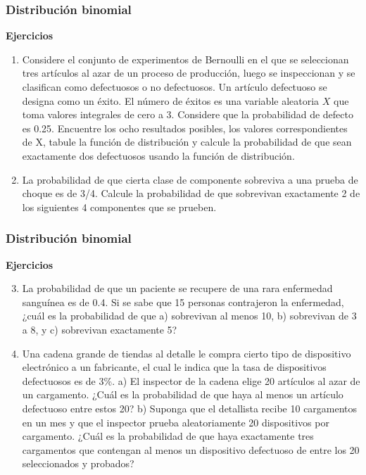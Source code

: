 \documentclass[spanish]{beamer}
\begin{document}
\begin{frame}
\frametitle{Distribución binomial}
\textbf{Ejercicios}

  \begin{enumerate}
  
  
\item Considere el conjunto de experimentos de Bernoulli en el que se seleccionan tres artículos al azar de un proceso de producción, luego se inspeccionan y se clasifican como defectuosos o no defectuosos. Un artículo defectuoso se designa como un éxito. El número de éxitos es una variable aleatoria $X$ que toma valores integrales de cero a 3. Considere que la probabilidad de defecto es 0.25. Encuentre los ocho resultados posibles, los valores correspondientes de X, tabule la función de distribución y calcule la probabilidad de que sean exactamente dos defectuosos usando la función de distribución.  
    
\item La probabilidad de que cierta clase de componente sobreviva a una prueba de choque es de 3/4. Calcule la probabilidad de que sobrevivan exactamente 2 de los siguientes 4 componentes que se prueben.

    
\end{enumerate}      
    
\end{frame}
\begin{frame}
\frametitle{Distribución binomial}
\textbf{Ejercicios}

  \begin{enumerate}
  \setcounter{enumi}{2}
\item La probabilidad de que un paciente se recupere de una rara enfermedad sanguínea es de 0.4. Si se sabe que 15 personas contrajeron la enfermedad, ¿cuál es la probabilidad de que a) sobrevivan al menos 10, b) sobrevivan de 3 a 8, y c) sobrevivan exactamente 5?
  
    
\item Una cadena grande de tiendas al detalle le compra cierto tipo de dispositivo electrónico a un fabricante, el cual le indica que la tasa de dispositivos defectuosos es de 3\%. 
    a) El inspector de la cadena elige 20 artículos al azar de un cargamento. ¿Cuál es la probabilidad de que haya al menos un artículo defectuoso entre estos 20?
    b) Suponga que el detallista recibe 10 cargamentos en un mes y que el inspector prueba aleatoriamente 20 dispositivos por cargamento. ¿Cuál es la probabilidad de que haya exactamente tres cargamentos que contengan al menos un dispositivo defectuoso de entre los 20 seleccionados y probados?

\end{enumerate}      
    
\end{frame}
\end{document}
